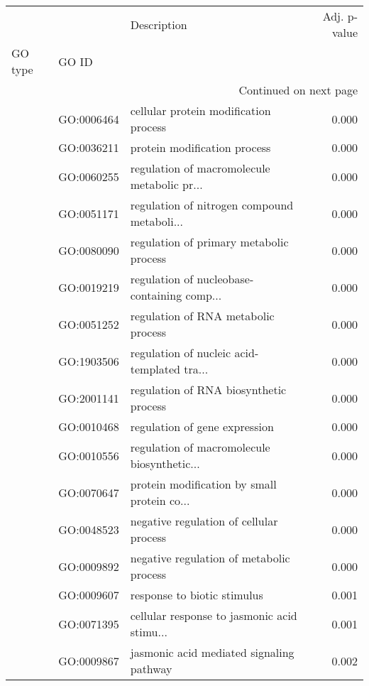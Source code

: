 \begin{longtable}{lllr}
\toprule
   &            &                                  Description &  Adj. p-value \\
GO type & GO ID &                                              &               \\
\midrule
\endhead
\midrule
\multicolumn{4}{r}{{Continued on next page}} \\
\midrule
\endfoot

\bottomrule
\endlastfoot
\multirow{105}{*}{BP} & GO:0006464 &        cellular protein modification process &         0.000 \\
   & GO:0036211 &                 protein modification process &         0.000 \\
   & GO:0060255 &  regulation of macromolecule metabolic pr... &         0.000 \\
   & GO:0051171 &  regulation of nitrogen compound metaboli... &         0.000 \\
   & GO:0080090 &      regulation of primary metabolic process &         0.000 \\
   & GO:0019219 &  regulation of nucleobase-containing comp... &         0.000 \\
   & GO:0051252 &          regulation of RNA metabolic process &         0.000 \\
   & GO:1903506 &  regulation of nucleic acid-templated tra... &         0.000 \\
   & GO:2001141 &       regulation of RNA biosynthetic process &         0.000 \\
   & GO:0010468 &                regulation of gene expression &         0.000 \\
   & GO:0010556 &  regulation of macromolecule biosynthetic... &         0.000 \\
   & GO:0070647 &  protein modification by small protein co... &         0.000 \\
   & GO:0048523 &      negative regulation of cellular process &         0.000 \\
   & GO:0009892 &     negative regulation of metabolic process &         0.000 \\
   & GO:0009607 &                  response to biotic stimulus &         0.001 \\
   & GO:0071395 &  cellular response to jasmonic acid stimu... &         0.001 \\
   & GO:0009867 &     jasmonic acid mediated signaling pathway &         0.002 \\

\end{longtable}
